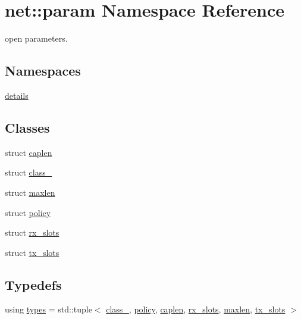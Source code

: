 \hypertarget{namespacenet_1_1param}{\section{net\+:\+:param Namespace Reference}
\label{namespacenet_1_1param}
}


open parameters.  


\subsection*{Namespaces}
\begin{DoxyCompactItemize}
\item 
 \hyperlink{namespacenet_1_1param_1_1details}{details}
\end{DoxyCompactItemize}
\subsection*{Classes}
\begin{DoxyCompactItemize}
\item 
struct \hyperlink{structnet_1_1param_1_1caplen}{caplen}
\item 
struct \hyperlink{structnet_1_1param_1_1class__}{class\+\_\+}
\item 
struct \hyperlink{structnet_1_1param_1_1maxlen}{maxlen}
\item 
struct \hyperlink{structnet_1_1param_1_1policy}{policy}
\item 
struct \hyperlink{structnet_1_1param_1_1rx__slots}{rx\+\_\+slots}
\item 
struct \hyperlink{structnet_1_1param_1_1tx__slots}{tx\+\_\+slots}
\end{DoxyCompactItemize}
\subsection*{Typedefs}
\begin{DoxyCompactItemize}
\item 
using \hyperlink{namespacenet_1_1param_a0d926c5e535309178d47ac5366bfb539}{types} = std\+::tuple$<$ \hyperlink{structnet_1_1param_1_1class__}{class\+\_\+}, \hyperlink{structnet_1_1param_1_1policy}{policy}, \hyperlink{structnet_1_1param_1_1caplen}{caplen}, \hyperlink{structnet_1_1param_1_1rx__slots}{rx\+\_\+slots}, \hyperlink{structnet_1_1param_1_1maxlen}{maxlen}, \hyperlink{structnet_1_1param_1_1tx__slots}{tx\+\_\+slots} $>$
\end{DoxyCompactItemize}

